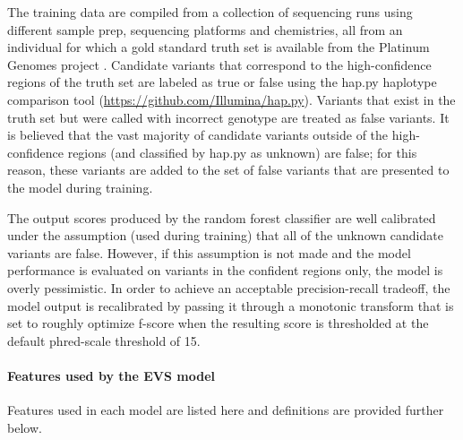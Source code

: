 \documentclass{article}
\begin{document}
The training data are compiled from a collection of sequencing runs using different sample prep, sequencing platforms and chemistries, all from an individual for which a gold standard truth set is available from the Platinum Genomes project \cite{eberle2017}. Candidate variants that correspond to the high-confidence regions of the truth set are labeled as true or false using the hap.py haplotype comparison tool (\url{https://github.com/Illumina/hap.py}). Variants that exist in the truth set but were called with incorrect genotype are treated as false variants. It is believed that the vast majority of candidate variants outside of the high-confidence regions (and classified by hap.py as unknown) are false; for this reason, these variants are added to the set of false variants that are presented to the model during training.

The output scores produced by the random forest classifier are well calibrated under the assumption (used during training) that all of the unknown candidate variants are false. However, if this assumption is not made and the model performance is evaluated on variants in the confident regions only, the model is overly pessimistic. In order to achieve an acceptable precision-recall tradeoff, the model output is recalibrated by passing it through a monotonic transform that is set to roughly optimize f-score when the resulting score is thresholded at the default phred-scale threshold of 15.

\paragraph{Features used by the EVS model}

Features used in each model are listed here and definitions are provided further below.
\end{document}
